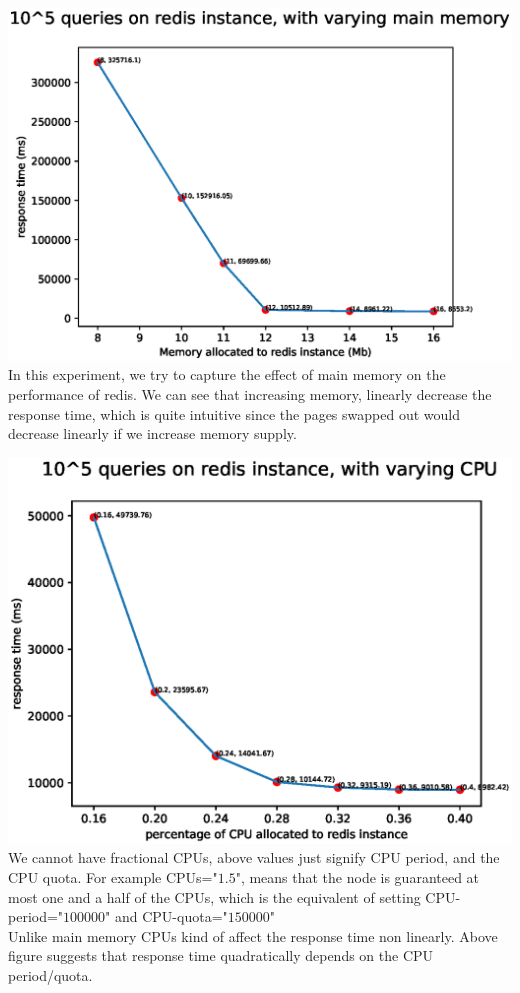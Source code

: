 \documentclass[11pt]{article}
\begin{document}
\includegraphics[width=\textwidth]{fig3.eps}
In this experiment, we try to capture the effect of main memory on the performance
of redis. We can see that increasing memory, linearly decrease the response time,
which is quite intuitive since the pages swapped out would decrease linearly 
if we increase memory supply.

\includegraphics[width=\textwidth]{fig4.eps}
We cannot have fractional CPUs, above values just signify CPU period,
and the CPU quota. For example CPUs="$1.5$", means that the node is
guaranteed at most one and a half of the CPUs, which is the equivalent
of setting CPU-period="$100000$" and CPU-quota="$150000$"
\\

Unlike main memory CPUs kind of affect the response time non linearly.
Above figure suggests that response time quadratically depends on the 
CPU period/quota.
\end{document}
